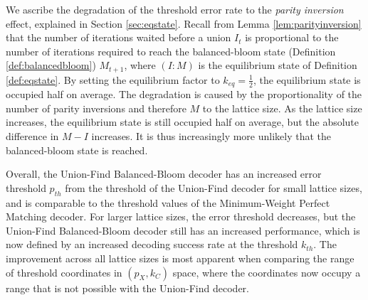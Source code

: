 We ascribe the degradation of the threshold error rate to the \emph{parity inversion} effect, explained in Section \ref{sec:eqstate}. Recall from Lemma \ref{lem:parityinversion} that the number of iterations waited before a union $I_t$ is proportional to the number of iterations required to reach the balanced-bloom state (Definition \ref{def:balancedbloom}) $M_{t+1}$, where $(I:M)$ is the equilibrium state of Definition \ref{def:eqstate}. By setting the equilibrium factor to $k_{eq}=\frac{1}{2}$, the equilibrium state is occupied half on average. The degradation is caused by the proportionality of the number of parity inversions and therefore $M$ to the lattice size. As the lattice size increases, the equilibrium state is still occupied half on average, but the absolute difference in $M-I$ increases. It is thus increasingly more unlikely that the balanced-bloom state is reached. 

Overall, the Union-Find Balanced-Bloom decoder has an increased error threshold $p_{th}$ from the threshold of the Union-Find decoder for small lattice sizes, and is comparable to the threshold values of the Minimum-Weight Perfect Matching decoder. For larger lattice sizes, the error threshold decreases, but the Union-Find Balanced-Bloom decoder still has an increased performance, which is now defined by an increased decoding success rate at the threshold $k_{th}$. The improvement across all lattice sizes is most apparent when comparing the range of threshold coordinates in $(p_X, k_C)$ space, where the coordinates now occupy a range that is not possible with the Union-Find decoder. 

